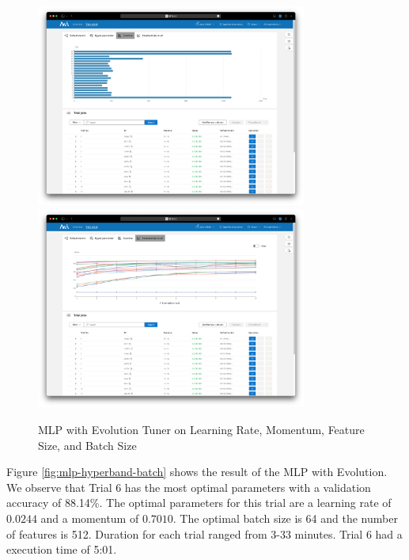 \documentclass{article}
\begin{document}
\begin{figure}
    \centerline{\includegraphics[width=3.5in]{../proj3/figures/mlp_evolution_batch_latency.png}\includegraphics[width=3.5in]{../proj3/figures/mlp_evolution_batch_intermediate.png}}
    \caption{MLP with Evolution Tuner on Learning Rate, Momentum, Feature Size, and Batch Size}
    \label{fig:mlp-evolution-batch}
\end{figure}

Figure \ref{fig:mlp-hyperband-batch} shows the result of the MLP with Evolution. We observe that Trial 6 has the most optimal parameters with a validation accuracy of 88.14\%. The optimal parameters for this trial are a learning rate of $0.0244$ and a momentum of $0.7010$. The optimal batch size is 64 and the number of features is 512. Duration for each trial ranged from 3-33 minutes. Trial 6 had a execution time of 5:01.
\end{document}
